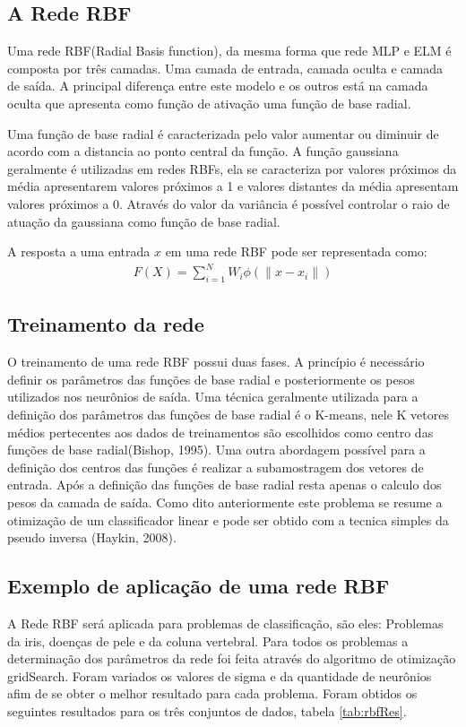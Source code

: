 \documentclass[
	article,			%
	11pt,				%
	oneside,			%
	a4paper,			%
	english,			%
	brazil,				%
	sumario=tradicional
	]{abntex2}
\begin{document}
\subsection{A Rede RBF}
Uma rede RBF(Radial Basis function), da mesma forma que rede MLP e ELM é
composta por três camadas.
Uma camada de entrada, camada oculta e camada de saída. A principal diferença entre
este modelo e os outros está na camada oculta que apresenta como função de
ativação uma função de base radial.

Uma função de base radial é caracterizada pelo valor aumentar ou
diminuir de acordo com a distancia ao ponto central da função. A função
gaussiana geralmente é utilizadas em redes RBFs, ela se caracteriza por valores
próximos da média apresentarem valores próximos a 1 e valores distantes da média
apresentam valores próximos a 0. Através do valor da variância é
possível controlar o raio de atuação da gaussiana como função de base
radial.

A resposta a uma entrada $x$ em uma rede RBF pode ser representada como:
\begin{align}
F(X)=\sum^{N}_{i=1}W_i\phi(\|x-x_i\|)
\end{align}

\subsection{Treinamento da rede}
O treinamento de uma rede RBF possui duas fases. A princípio é necessário
definir os parâmetros das funções de base radial e posteriormente os pesos
utilizados nos neurônios de saída. Uma técnica geralmente utilizada para a
definição dos parâmetros das funções de base radial é o K-means, nele K
vetores médios pertecentes aos dados de treinamentos são escolhidos como centro
das funções de base radial(Bishop, 1995). Uma outra abordagem possível para a
definição dos centros das funções é realizar a subamostragem dos vetores de
entrada. Após a definição das funções de base radial resta apenas o calculo dos
pesos da camada de saída. Como dito anteriormente este problema se resume a
otimização de um classificador linear e pode ser obtido com a tecnica simples
da pseudo inversa (Haykin, 2008).

\subsection{Exemplo de aplicação de uma rede RBF}
A Rede RBF será aplicada para problemas de classificação, são eles:
Problemas da iris, doenças de pele e da coluna vertebral. Para todos os
problemas a determinação dos parâmetros da rede foi feita através do algoritmo
de otimização gridSearch. Foram variados os valores de sigma e da quantidade de
neurônios afim de se obter o melhor resultado para cada problema.
Foram obtidos os seguintes resultados para os três conjuntos de dados, tabela
\ref{tab:rbfRes}.
\end{document}
